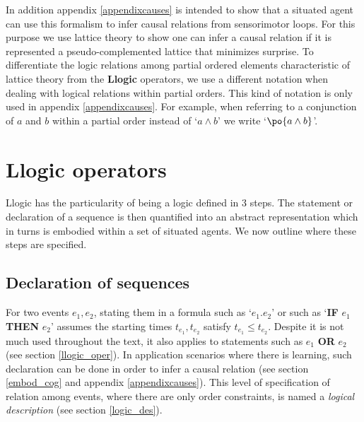 \documentclass[
		twoside,openright,titlepage,numbers=noenddot,manychapters,
		headinclude,%
                footinclude=false,cleardoublepage=empty,
                BCOR=5mm,
		fontsize=11pt, %
                 enabledeprecatedfontcommands]{scrreprt}
\begin{document}
 In addition appendix \ref{appendixcauses} is intended to show that a situated agent can use this formalism to infer causal relations from sensorimotor loops. For this purpose we use lattice theory to show  
 one can infer a causal relation if it is represented a pseudo-complemented lattice that minimizes surprise.  To differentiate  the logic relations among partial ordered elements characteristic of lattice theory from the \textbf{Llogic} operators, we use a different notation when dealing with logical relations within partial orders. This kind of notation is only used in appendix \ref{appendixcauses}. For example, when referring to a conjunction of $a$ and $b$ within a partial order instead of `$a \wedge b$'  we write `$ \po{ a \wedge b}$'.  


\section{Llogic operators}
\label{ap_llogic}

Llogic has the particularity of being a logic defined in 3 steps. The statement or declaration of a sequence is then quantified into an abstract representation which in turns is embodied within a set of situated agents. We now outline where these steps are specified.


\subsection{Declaration of sequences}

For two events $e_1,e_2$, stating them in a formula such as `$e_1.e_2$' or such as `\textbf{IF} $e_1$ \textbf{THEN} $ e_2$' assumes the starting times $t_{e_1},t_{e_2}$ satisfy  $t_{e_1} \leq t_{e_2}$. Despite it is not much used throughout the text, it also applies to statements such as $e_1$ \textbf{OR} $e_2$ (see section \ref{llogic_oper}).  In application scenarios where there is learning, such declaration can be done in order to infer a causal relation  (see section \ref{embod_cog} and appendix \ref{appendixcauses}). This level of specification of relation among events, where there are only order constraints, is named a \emph{logical description} (see section \ref{logic_des}).
\end{document}
